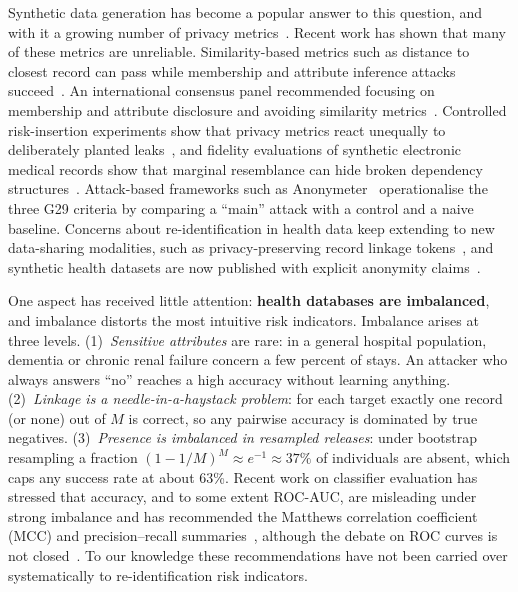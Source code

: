 \documentclass[preprint,12pt]{elsarticle}
\newcommand{\G}{G29}
\begin{document}
Synthetic data generation has become a popular answer to this question, and with it a growing number of privacy metrics~\cite{steier2025metrics,hu2026synqp,pathak2026kde}. Recent work has shown that many of these metrics are unreliable. Similarity-based metrics such as distance to closest record can pass while membership and attribute inference attacks succeed~\cite{ganev2025inadequacy,yao2025dcr}. An international consensus panel recommended focusing on membership and attribute disclosure and avoiding similarity metrics~\cite{pilgram2025consensus}. Controlled risk-insertion experiments show that privacy metrics react unequally to deliberately planted leaks~\cite{plasencia2025empirical}, and fidelity evaluations of synthetic electronic medical records show that marginal resemblance can hide broken dependency structures~\cite{kuo2026synthetic}. Attack-based frameworks such as Anonymeter~\cite{giomi2023anonymeter} operationalise the three \G{} criteria by comparing a ``main'' attack with a control and a naive baseline. Concerns about re-identification in health data keep extending to new data-sharing modalities, such as privacy-preserving record linkage tokens~\cite{eliazar2026pprl}, and synthetic health datasets are now published with explicit anonymity claims~\cite{nanevski2026fall,guillaudeux2023avatar}.

One aspect has received little attention: \textbf{health databases are imbalanced}, and imbalance distorts the most intuitive risk indicators. Imbalance arises at three levels. (1)~\emph{Sensitive attributes} are rare: in a general hospital population, dementia or chronic renal failure concern a few percent of stays. An attacker who always answers ``no'' reaches a high accuracy without learning anything. (2)~\emph{Linkage is a needle-in-a-haystack problem}: for each target exactly one record (or none) out of $M$ is correct, so any pairwise accuracy is dominated by true negatives. (3)~\emph{Presence is imbalanced in resampled releases}: under bootstrap resampling a fraction $(1-1/M)^M \approx e^{-1} \approx 37\%$ of individuals are absent, which caps any success rate at about 63\%. Recent work on classifier evaluation has stressed that accuracy, and to some extent ROC-AUC, are misleading under strong imbalance and has recommended the Matthews correlation coefficient (MCC) and precision--recall summaries~\cite{chicco2020mcc,chicco2023mccroc,saito2015prc,imani2026rocauc}, although the debate on ROC curves is not closed~\cite{richardson2024roc}. To our knowledge these recommendations have not been carried over systematically to re-identification risk indicators.
\end{document}
